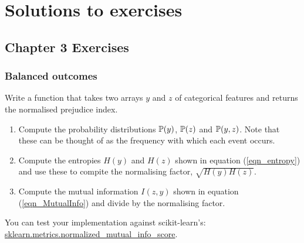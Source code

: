 \chapter{Solutions to exercises}\label{app_Solutions}


\section{Chapter 3 Exercises}

\subsection{Balanced outcomes}

\begin{lookbox}
Write a function that takes two arrays $y$ and $z$ of categorical features and returns the normalised prejudice index.
\begin{enumerate}
\item Compute the probability distributions $\mathbb{P}(y)$, $\mathbb{P}(z)$ and $\mathbb{P}(y,z)$. Note that these can be thought of as the frequency with which each event occurs.
\item Compute the entropies $H(y)$ and $H(z)$ shown in equation (\ref{eqn_entropy}) and use these to compite the normalising factor, $\sqrt{H(y)H(z)}$.
\item Compute the mutual information $I(z,y)$ shown in equation (\ref{eqn_MutualInfo}) and divide by the normalising factor.
\end{enumerate}
You can test your implementation against scikit-learn's:\\ \href{https://scikit-learn.org/stable/modules/generated/sklearn.metrics.normalized\_mutual\_info\_score.html}{sklearn.metrics.normalized\_mutual\_info\_score}.
\end{lookbox}

